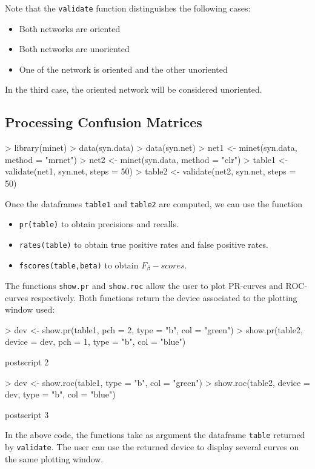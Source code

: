 \documentclass{article}
\newcommand{\Rfunction}[1]{{\texttt{#1}}}
\newcommand{\Robject}[1]{{\texttt{#1}}}
\begin{document}
Note that the \Rfunction{validate} function distinguishes the following cases:
\begin{itemize}
      \item Both networks are oriented
      \item Both networks are unoriented
      \item One of the network is oriented and the other unoriented
\end{itemize}
In the third case, the oriented network will be considered unoriented.

\subsection{Processing Confusion Matrices}

\begin{Schunk}
\begin{Sinput}
> library(minet)
> data(syn.data)
> data(syn.net)
> net1 <- minet(syn.data, method = "mrnet")
> net2 <- minet(syn.data, method = "clr")
> table1 <- validate(net1, syn.net, steps = 50)
> table2 <- validate(net2, syn.net, steps = 50)
\end{Sinput}
\end{Schunk}
Once the dataframes \Robject{table1} and \Robject{table2} are computed, we can use the function
\begin{itemize}
\item \Rfunction{pr(table)} to obtain precisions and recalls.
\item \Rfunction{rates(table)} to obtain true positive rates and false positive rates.
\item \Rfunction{fscores(table,beta)} to obtain $F_{\beta}-scores$.
\end{itemize}
The functions \Rfunction{show.pr} and \Rfunction{show.roc} allow the user to plot PR-curves and ROC-curves respectively. Both functions return 
the device associated to the plotting window used: 
\begin{Schunk}
\begin{Sinput}
> dev <- show.pr(table1, pch = 2, type = "b", col = "green")
> show.pr(table2, device = dev, pch = 1, type = "b", col = "blue")
\end{Sinput}
\begin{Soutput}
postscript 
         2 
\end{Soutput}
\begin{Sinput}
> dev <- show.roc(table1, type = "b", col = "green")
> show.roc(table2, device = dev, type = "b", col = "blue")
\end{Sinput}
\begin{Soutput}
postscript 
         3 
\end{Soutput}
\end{Schunk}
In the above code, the functions take as argument the dataframe \Robject{table} returned by \Rfunction{validate}. The user can use the returned device
to display several curves on the same plotting window.
\end{document}
